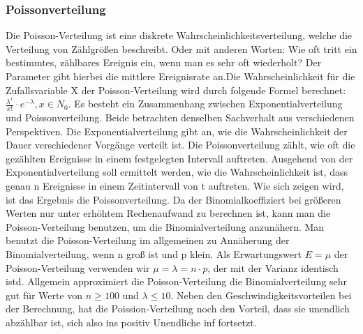 \documentclass[letterpaper, titlepage]{article}
\begin{document}
\subsubsection{Poissonverteilung}\label{Poissonverteilung}
Die Poisson-Verteilung ist eine diskrete Wahrscheinlichkeitsverteilung, welche die Verteilung von Zählgrößen beschreibt. Oder mit anderen Worten: Wie oft tritt ein bestimmtes, zählbares Ereignis ein, wenn man es sehr oft wiederholt? Der Parameter gibt hierbei die mittlere Ereignisrate an.Die Wahrscheinlichkeit für die Zufallsvariable X der Poisson-Verteilung wird durch folgende Formel berechnet: $\frac{\lambda^x}{x!}\cdot e^{-\lambda}, x\in N_0$. Es besteht ein Zusammenhang zwischen Exponentialverteilung und Poissonverteilung. Beide betrachten denselben Sachverhalt aus verschiedenen Perspektiven. Die Exponentialverteilung gibt an, wie die Wahrscheinlichkeit der Dauer verschiedener Vorgänge verteilt ist. Die Poissonverteilung zählt, wie oft die gezählten Ereignisse in einem festgelegten Intervall auftreten. Ausgehend von der Exponentialverteilung soll ermittelt werden, wie die Wahrscheinlichkeit ist, dass genau n Ereignisse in einem Zeitintervall von t auftreten. Wie sich zeigen wird, ist das Ergebnis die Poissonverteilung. Da der Binomialkoeffiziert bei größeren Werten nur unter erhöhtem Rechenaufwand zu berechnen ist, kann man die Poisson-Verteilung benutzen, um die Binomialverteilung anzunähern. Man benutzt die Poisson-Verteilung im allgemeinen zu Annäherung der Binomialverteilung, wenn n groß ist und p klein. Als Erwartungswert $E=\mu$ der Poisson-Verteilung verwenden wir $\mu=\lambda=n \cdot p$, der mit der Varianz identisch istd. Allgemein approximiert die Poisson-Verteilung die Binomialverteilung sehr gut für Werte von $n \geq 100$ und $\lambda \leq 10$. Neben den Geschwindigkeitsvorteilen bei der Berechnung, hat die Poission-Verteilung noch den Vorteil, dass sie unendlich abzählbar ist, sich also ins positiv Unendliche inf fortsetzt.

\vspace{0.35cm}
\end{document}
